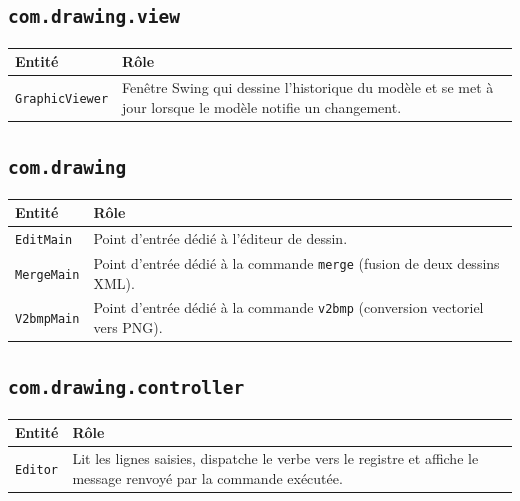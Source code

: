 \documentclass[11pt,a4paper]{article}
\begin{document}
\subsection{\protect\texttt{com.drawing.view}}

\begin{tabular}{|>{\raggedright\arraybackslash}p{}|p{}|}
\hline
\textbf{Entité} & \textbf{Rôle} \\
\hline
\texttt{GraphicViewer} & Fenêtre Swing qui dessine l'historique du modèle et se met à jour lorsque le modèle notifie un changement. \\
\hline
\end{tabular}

\subsection{\protect\texttt{com.drawing}}

\begin{tabular}{|>{\raggedright\arraybackslash}p{}|p{}|}
\hline
\textbf{Entité} & \textbf{Rôle} \\
\hline
\texttt{EditMain} & Point d'entrée dédié à l'éditeur de dessin. \\
\hline
\texttt{MergeMain} & Point d'entrée dédié à la commande \texttt{merge} (fusion de deux dessins XML). \\
\hline
\texttt{V2bmpMain} & Point d'entrée dédié à la commande \texttt{v2bmp} (conversion vectoriel vers PNG). \\
\hline
\end{tabular}

\subsection{\protect\texttt{com.drawing.controller}}

\begin{tabular}{|>{\raggedright\arraybackslash}p{}|p{}|}
\hline
\textbf{Entité} & \textbf{Rôle} \\
\hline
\texttt{Editor} & Lit les lignes saisies, dispatche le verbe vers le registre et affiche le message renvoyé par la commande exécutée. \\
\hline
\end{tabular}
\end{document}
